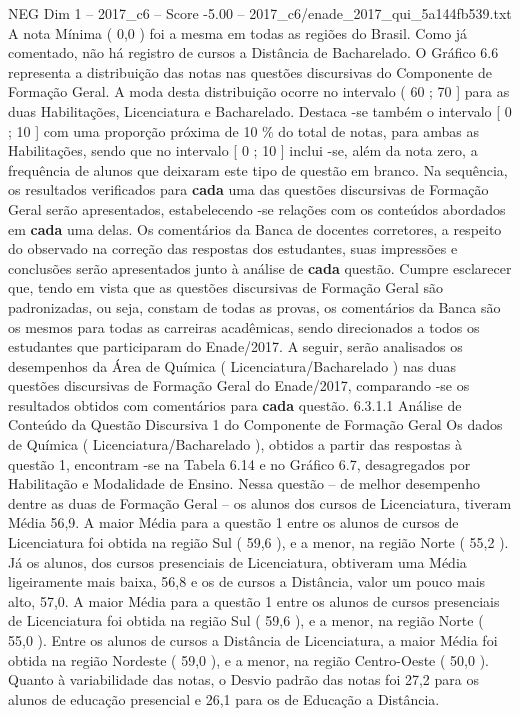 \begin{textsample}{NEG Dim 1 – 2017\_c6 – Score -5.00 – 2017\_c6/enade\_2017\_qui\_5a144fb539.txt}
A nota Mínima ( 0,0 ) foi a mesma em todas as regiões do Brasil.
Como já comentado, não há registro de cursos a Distância de Bacharelado.
O Gráfico 6.6 representa a distribuição das notas nas questões discursivas do Componente de Formação Geral.
A moda desta distribuição ocorre no intervalo ( 60 ; 70 ] para as duas Habilitações, Licenciatura e Bacharelado.
Destaca -se também o intervalo [ 0 ; 10 ] com uma proporção próxima de 10 \% do total de notas, para ambas as Habilitações, sendo que no intervalo [ 0 ; 10 ] inclui -se, além da nota zero, a frequência de alunos que deixaram este tipo de questão em branco.
Na sequência, os resultados verificados para \textbf{cada} uma das questões discursivas de Formação Geral serão apresentados, estabelecendo -se relações com os conteúdos abordados em \textbf{cada} uma delas.
Os comentários da Banca de docentes corretores, a respeito do observado na correção das respostas dos estudantes, suas impressões e conclusões serão apresentados junto à análise de \textbf{cada} questão.
Cumpre esclarecer que, tendo em vista que as questões discursivas de Formação Geral são padronizadas, ou seja, constam de todas as provas, os comentários da Banca são os mesmos para todas as carreiras acadêmicas, sendo direcionados a todos os estudantes que participaram do Enade/2017.
A seguir, serão analisados os desempenhos da Área de Química ( Licenciatura/Bacharelado ) nas duas questões discursivas de Formação Geral do Enade/2017, comparando -se os resultados obtidos com comentários para \textbf{cada} questão. 6.3.1.1 Análise de Conteúdo da Questão Discursiva 1 do Componente de Formação Geral Os dados de Química ( Licenciatura/Bacharelado ), obtidos a partir das respostas à questão 1, encontram -se na Tabela 6.14 e no Gráfico 6.7, desagregados por Habilitação e Modalidade de Ensino.
Nessa questão – de melhor desempenho dentre as duas de Formação Geral – os alunos dos cursos de Licenciatura, tiveram Média 56,9.
A maior Média para a questão 1 entre os alunos de cursos de Licenciatura foi obtida na região Sul ( 59,6 ), e a menor, na região Norte ( 55,2 ).
Já os alunos, dos cursos presenciais de Licenciatura, obtiveram uma Média ligeiramente mais baixa, 56,8 e os de cursos a Distância, valor um pouco mais alto, 57,0.
A maior Média para a questão 1 entre os alunos de cursos presenciais de Licenciatura foi obtida na região Sul ( 59,6 ), e a menor, na região Norte ( 55,0 ).
Entre os alunos de cursos a Distância de Licenciatura, a maior Média foi obtida na região Nordeste ( 59,0 ), e a menor, na região Centro-Oeste ( 50,0 ).
Quanto à variabilidade das notas, o Desvio padrão das notas foi 27,2 para os alunos de educação presencial e 26,1 para os de Educação a Distância.

\end{textsample}
